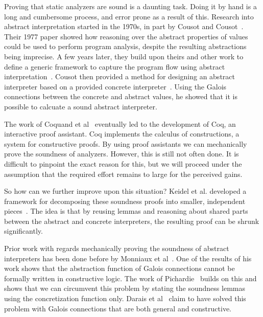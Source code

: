 Proving that static analyzers are sound is a daunting task. Doing it by hand is
a long and cumbersome process, and error prone as a result of this.
Research into abstract interpretation started in the 1970s, in part by Cousot 
and Cousot~\cite{cousot1977abstract}. Their 1977 paper showed how reasoning over
the abstract properties of values could be used to perform program analysis,
despite the resulting abstractions being imprecise. A few years later, they
build upon theirs and other work to define a generic framework to capture the
program flow using abstract interpretation~\cite{cousot1979systematic}.
Cousot then provided a method for designing an abstract interpreter
based on a provided concrete interpreter~\cite{cousot1999calculational}.
Using the Galois connections between
the concrete and abstract values, he showed that it is possible to calcuate 
a sound abstract interpreter.

The work of Coquand et al~\cite{coquand1986calculus} eventually led to the
development of Coq, an interactive proof assistant. Coq implements the calculus
of constructions, a system for constructive proofs. By using proof assistants 
we can mechanically prove the soundness of analyzers. 
However, this is still not often done. It is difficult to
pinpoint the exact reason for this, but we will proceed under the assumption
that the required effort remains to large for the perceived gains.

So how can we further improve upon this situation? Keidel et al. developed a 
framework for decomposing these soundness proofs into smaller,
independent pieces~\cite{keidel2018compositional}.
The idea is that by reusing lemmas and reasoning about 
shared parts between the abstract and concrete interpreters, the resulting 
proof can be shrunk significantly.

Prior work with regards mechanically proving the soundness of abstract
interpreters has been done before by Monniaux et al~\cite{Monniaux3}. One of the
results of his work shows that the abstraction function of Galois connections
cannot be formally written in constructive logic. The work of 
Pichardie~\cite{pichardie2005interpretation} builds on this and shows that we
can circumvent this problem by stating the soundness lemmas using the
concretization function only. Darais et al~\cite{darais2016constructive} claim
to have solved this problem with Galois connections that are both general and
constructive.


